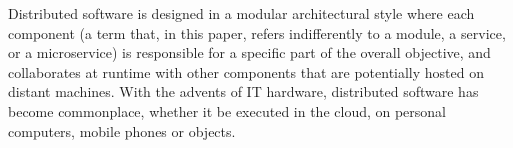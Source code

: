 %

Distributed software is designed in a modular architectural style
where each component (a term that, in this paper, refers indifferently
to a module, a service, or a microservice) is responsible for a
specific part of the overall objective, and collaborates at runtime
with other components that are potentially hosted on distant
machines. With the advents of IT hardware, distributed software has
become commonplace, whether it be executed in the cloud, on personal
computers, mobile phones or objects.

